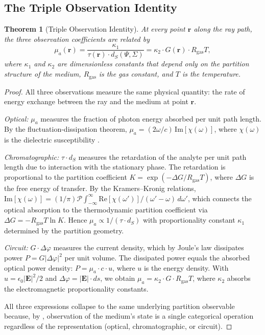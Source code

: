\documentclass[11pt,twocolumn,a4paper]{article}
\newtheorem{theorem}{Theorem}[section]
\theoremstyle{definition}
\theoremstyle{remark}
\begin{document}
\subsection{The Triple Observation Identity}

\begin{theorem}[Triple Observation Identity]\label{thm:triple-observation}
At every point $\mathbf{r}$ along the ray path, the three observation coefficients are related by
\begin{equation}\label{eq:triple-observation}
    \mu_a(\mathbf{r}) = \frac{\kappa_1}{\tau(\mathbf{r}) \cdot d_S(\Psi, \Sigma)} = \kappa_2 \cdot G(\mathbf{r}) \cdot R_{\mathrm{gas}} T,
\end{equation}
where $\kappa_1$ and $\kappa_2$ are dimensionless constants that depend only on the partition structure of the medium, $R_{\mathrm{gas}}$ is the gas constant, and $T$ is the temperature.
\end{theorem}

\begin{proof}
All three observations measure the same physical quantity: the rate of energy exchange between the ray and the medium at point $\mathbf{r}$.

\emph{Optical:} $\mu_a$ measures the fraction of photon energy absorbed per unit path length.  By the fluctuation-dissipation theorem, $\mu_a = (2\omega/c) \, \mathrm{Im}[\chi(\omega)]$, where $\chi(\omega)$ is the dielectric susceptibility \citep{born1999principles}.

\emph{Chromatographic:} $\tau \cdot d_S$ measures the retardation of the analyte per unit path length due to interaction with the stationary phase.  The retardation is proportional to the partition coefficient $K = \exp(-\Delta G / R_{\mathrm{gas}}T)$, where $\Delta G$ is the free energy of transfer.  By the Kramers--Kronig relations, $\mathrm{Im}[\chi(\omega)] = (1/\pi)\mathcal{P}\!\int_{-\infty}^{\infty} \mathrm{Re}[\chi(\omega')] / (\omega' - \omega) \, d\omega'$, which connects the optical absorption to the thermodynamic partition coefficient via $\Delta G = -R_{\mathrm{gas}}T \ln K$.  Hence $\mu_a \propto 1/(\tau \cdot d_S)$ with proportionality constant $\kappa_1$ determined by the partition geometry.

\emph{Circuit:} $G \cdot \Delta\varphi$ measures the current density, which by Joule's law dissipates power $P = G |\Delta\varphi|^2$ per unit volume.  The dissipated power equals the absorbed optical power density: $P = \mu_a \cdot c \cdot u$, where $u$ is the energy density.  With $u = \epsilon_0 |\mathbf{E}|^2 / 2$ and $\Delta\varphi = |\mathbf{E}| \cdot ds$, we obtain $\mu_a = \kappa_2 \cdot G \cdot R_{\mathrm{gas}}T$, where $\kappa_2$ absorbs the electromagnetic proportionality constants.

All three expressions collapse to the same underlying partition observable because, by , observation of the medium's state is a single categorical operation regardless of the representation (optical, chromatographic, or circuit).
\end{proof}
\end{document}
